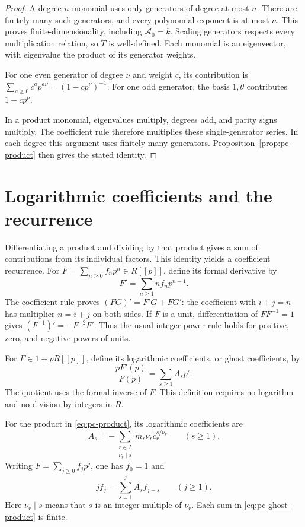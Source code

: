 \begin{proof}
A degree-$n$ monomial uses only generators of degree at most $n$.
There are finitely many such generators, and every polynomial exponent is
at most $n$. This proves finite-dimensionality, including
$\mathcal A_0=k$.
Scaling generators respects every multiplication relation, so $T$ is
well-defined. Each monomial is an eigenvector, with eigenvalue the product
of its generator weights.

For one even generator of degree $\nu$ and weight $c$, its contribution is
$\sum_{a\geq0}c^a p^{a\nu}=(1-cp^\nu)^{-1}$.
For one odd generator, the basis $1,\theta$ contributes $1-cp^\nu$.

In a product monomial, eigenvalues multiply, degrees add, and parity signs
multiply. The coefficient rule therefore multiplies these single-generator
series. In each degree this argument uses finitely many generators.
Proposition~\ref{prop:pc-product} then gives the stated identity.
\end{proof}

\section{Logarithmic coefficients and the recurrence}

Differentiating a product and dividing by that product gives a sum of
contributions from its individual factors. This identity yields a
coefficient recurrence.
For $F=\sum_{n\geq0}f_np^n\in R[[p]]$, define its formal derivative by
\[
 F'=\sum_{n\geq1}n f_np^{n-1}.
\]
The coefficient rule proves $(FG)'=F'G+FG'$:
the coefficient with $i+j=n$ has multiplier $n=i+j$ on both sides.
If $F$ is a unit, differentiation of $FF^{-1}=1$ gives
$(F^{-1})'=-F^{-2}F'$.
Thus the usual integer-power rule holds for positive, zero, and negative
powers of units.

For $F\in1+pR[[p]]$, define its logarithmic coefficients, or ghost
coefficients, by
\begin{equation}
 \frac{pF'(p)}{F(p)}=\sum_{s\geq1}A_s p^s.
 \label{eq:pc-ghost-definition}
\end{equation}
The quotient uses the formal inverse of $F$.
This definition requires no logarithm and no division by integers in $R$.

\begin{theorem}
\label{thm:pc-recurrence}
For the product in \eqref{eq:pc-product}, its logarithmic coefficients are
\begin{equation}
 A_s=-\sum_{\substack{r\in I\\\nu_r\mid s}}
                  m_r\nu_r c_r^{s/\nu_r}\qquad(s\geq1).
 \label{eq:pc-ghost-product}
\end{equation}
Writing $F=\sum_{j\geq0}f_jp^j$, one has $f_0=1$ and
\begin{equation}
 j f_j=\sum_{s=1}^j A_s f_{j-s}\qquad(j\geq1).
 \label{eq:pc-recurrence}
\end{equation}
Here $\nu_r\mid s$ means that $s$ is an integer multiple of $\nu_r$.
Each sum in \eqref{eq:pc-ghost-product} is finite.
\end{theorem}

